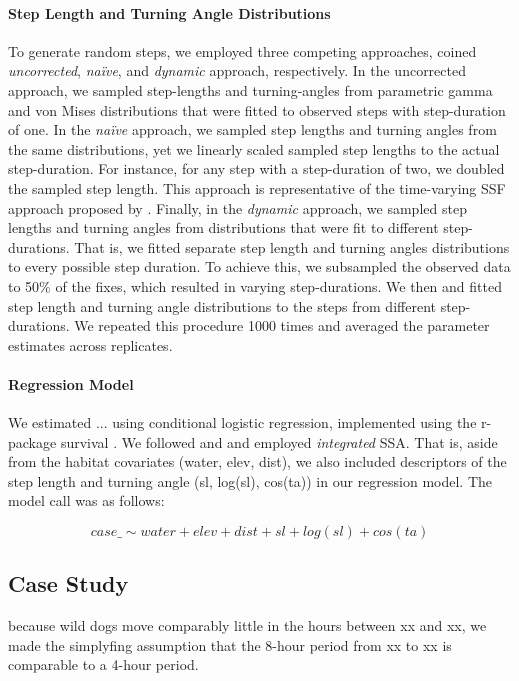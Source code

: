 \documentclass[abstract=on,10pt,a4paper,bibliography=totocnumbered]{article}
\begin{document}
\paragraph{Step Length and Turning Angle Distributions}
To generate random steps, we employed three competing approaches, coined
\textit{uncorrected}, \textit{na\"ive}, and \textit{dynamic} approach,
respectively. In the uncorrected approach, we sampled step-lengths and
turning-angles from parametric gamma and von Mises distributions that were
fitted to observed steps with step-duration of one. In the \textit{na\"ive}
approach, we sampled step lengths and turning angles from the same
distributions, yet we linearly scaled sampled step lengths to the actual
step-duration. For instance, for any step with a step-duration of two, we
doubled the sampled step length. This approach is representative of the
time-varying SSF approach proposed by \cite{Munden.2021}. Finally, in the
\textit{dynamic} approach, we sampled step lengths and turning angles from
distributions that were fit to different step-durations. That is, we fitted
separate step length and turning angles distributions to every possible step
duration. To achieve this, we subsampled the observed data to 50\% of the fixes,
which resulted in varying step-durations. We then and fitted step length and
turning angle distributions to the steps from different step-durations. We
repeated this procedure 1000 times and averaged the parameter estimates across
replicates.

\paragraph{Regression Model}
We estimated ... using conditional logistic regression, implemented using the
r-package \textsf{survival} \citep{Therneau.2021}. We followed \cite{Avgar.2016}
and \cite{Fieberg.2021} and employed \textit{integrated} SSA. That is, aside
from the habitat covariates (\textsf{water, elev, dist}), we also included
descriptors of the step length and turning angle (\textsf{sl, log(sl), cos(ta)})
in our regression model. The model call was as follows:

$$
case\_ \sim water + elev + dist + sl + log(sl) + cos(ta)
$$

\subsection{Case Study}

because wild dogs move comparably little in the hours between xx and xx, we made
the simplyfing assumption that the 8-hour period from xx to xx is comparable to
a 4-hour period.
\end{document}
